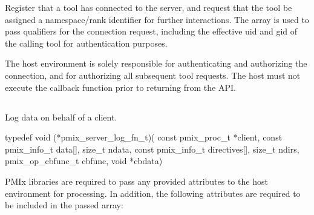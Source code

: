 \optattrend

\descr

Register that a tool has connected to the server, and request that the tool be assigned a namespace/rank identifier for further interactions.
The  array is used to pass qualifiers for the connection request, including the effective uid and gid of the calling tool for authentication purposes.

\advicermstart
The host environment is solely responsible for authenticating and authorizing the connection, and for authorizing all subsequent tool requests. The host must not execute the callback function prior to returning from the \ac{API}.

\advicermend


\subsection{}

\summary

Log data on behalf of a client.

\format

\cspecificstart
\begin{codepar}
typedef void (*pmix_server_log_fn_t)(
                             const pmix_proc_t *client,
                             const pmix_info_t data[], size_t ndata,
                             const pmix_info_t directives[], size_t ndirs,
                             pmix_op_cbfunc_t cbfunc, void *cbdata)
\end{codepar}
\cspecificend

\begin{arglist}
\end{arglist}


\reqattrstart
\ac{PMIx} libraries are required to pass any provided attributes to the host environment for processing. In addition, the following attributes are required to be included in the passed  array:

